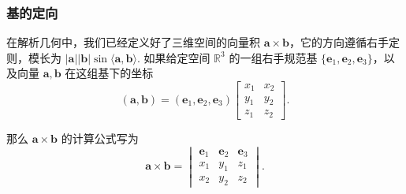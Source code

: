 \documentclass[10pt,openany]{article}
\theoremstyle{thmstyle} %
\theoremstyle{defstyle} %
\theoremstyle{prostyle} %
\theoremstyle{exastyle}
\theoremstyle{remstyle}
\newcommand{\R}{\mathbb{R}}
\begin{document}
\subsubsection{基的定向}\label{Sec 2.3.1}


在解析几何中，我们已经定义好了三维空间的向量积 \( \bm{a} \times \bm{b} \)，它的方向遵循右手定则，模长为 \( |\bm{a}||\bm{b}|\sin \langle \bm{a},\bm{b} \rangle \). 如果给定空间 \( \R^3 \) 的一组右手规范基 \( \{\bm{e}_1,\bm{e}_2,\bm{e}_3 \} \)，以及向量 \( \bm{a}, \bm{b} \) 在这组基下的坐标
\[ (\bm{a},\bm{b})=(\bm{e}_1,\bm{e}_2,\bm{e}_3)\begin{bmatrix}
	x_1 & x_2 \\ y_1 & y_2 \\ z_1 & z_2
\end{bmatrix}. \]

那么 \( \bm{a} \times \bm{b} \) 的计算公式写为
\[ \bm{a} \times \bm{b}= \begin{vmatrix}
	\bm{e}_1 & \bm{e}_2 & \bm{e}_3 \\
	x_1 & y_1 & z_1 \\
	x_2 & y_2 & z_2
\end{vmatrix}. \]
\end{document}
